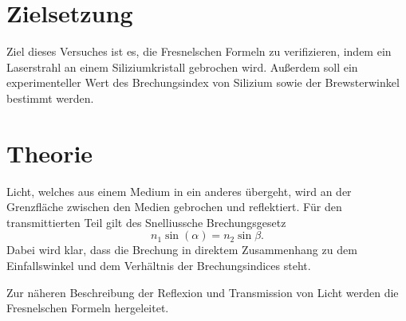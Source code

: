 \section{Zielsetzung}
Ziel dieses Versuches ist es, die Fresnelschen Formeln zu verifizieren, indem 
ein Laserstrahl an einem Siliziumkristall gebrochen wird.
Außerdem soll ein experimenteller Wert des Brechungsindex von Silizium sowie der
Brewsterwinkel bestimmt werden.

\section{Theorie}
\label{sec:Theorie}
Licht, welches aus einem Medium in ein anderes übergeht, wird an der Grenzfläche
zwischen den Medien gebrochen und reflektiert.
Für den transmittierten Teil gilt des Snelliussche Brechungsgesetz
\begin{equation}
    n_1\sin(\alpha) = n_2 \sin{\beta}. \label{eq:snellius}
\end{equation}
Dabei wird klar, dass die Brechung in direktem Zusammenhang zu dem Einfallswinkel
und dem Verhältnis der Brechungsindices steht.

Zur näheren Beschreibung der Reflexion und Transmission von Licht werden die Fresnelschen Formeln hergeleitet.

